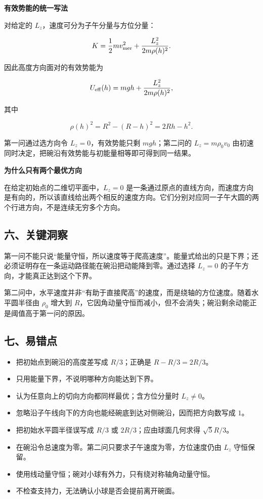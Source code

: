 \documentclass[12pt,a4paper,UTF8]{ctexart}
\newcommand{\tightlist}{\setlength{\itemsep}{0pt}\setlength{\parskip}{0pt}}
\begin{document}
\textbf{有效势能的统一写法}

对给定的 \(L_z\)，速度可分为子午分量与方位分量：

\[
K=\frac12mv_{\rm mer}^2
+\frac{L_z^2}{2m\rho(h)^2}.
\]

因此高度方向面对的有效势能为

\[
U_{\rm eff}(h)=mgh+
\frac{L_z^2}{2m\rho(h)^2},
\]

其中

\[
\rho(h)^2=R^2-(R-h)^2=2Rh-h^2.
\]

第一问通过选方向令 \(L_z=0\)，有效势能只剩 \(mgh\)；第二问的
\(L_z=m\rho_0v_0\)
由初速同时决定，把碗沿有效势能与初能量相等即可得到同一结果。

\textbf{为什么只有两个最优方向}

在给定初始点的二维切平面中，\(L_z=0\)
是一条通过原点的直线方向，而速度方向是有向的，所以该直线给出两个相反的速度方向。它们分别对应同一子午大圆的两个行进方向，不是连续无穷多个方向。

\subsection{六、关键洞察}\label{ux516dux5173ux952eux6d1eux5bdf-7}

第一问不能只说``能量守恒，所以速度等于爬高速度''。能量式给出的只是下界；还必须证明存在一条运动路径能在碗沿把动能降到零。通过选择
\(L_z=0\) 的子午方向，才能真正达到这个下界。

第二问中，水平速度并非``有助于直接爬高''的速度，而是绕轴的方位速度。随着水平圆半径由
\(\rho_0\) 增大到
\(R\)，它因角动量守恒而减小，但不会消失；碗沿剩余动能正是阈值高于第一问的原因。

\subsection{七、易错点}\label{ux4e03ux6613ux9519ux70b9-7}

\begin{itemize}
\tightlist
\item
  把初始点到碗沿的高度差写成 \(R/3\)；正确是 \(R-R/3=2R/3\)。
\item
  只用能量下界，不说明哪种方向能达到下界。
\item
  认为任意向上的切向方向都同样最优；含方位分量时 \(L_z\ne0\)。
\item
  忽略沿子午线向下的方向也能经碗底到达对侧碗沿，因而把方向数写成 \(1\)。
\item
  把初始水平圆半径误写成 \(R/3\) 或 \(2R/3\)；应由球面几何求得
  \(\sqrt5R/3\)。
\item
  在碗沿令总速度为零。第二问只要求子午速度为零，方位速度仍由 \(L_z\)
  守恒保留。
\item
  使用线动量守恒；碗对小球有外力，只有绕对称轴角动量守恒。
\item
  不检查支持力，无法确认小球是否会提前离开碗面。
\end{itemize}
\end{document}
